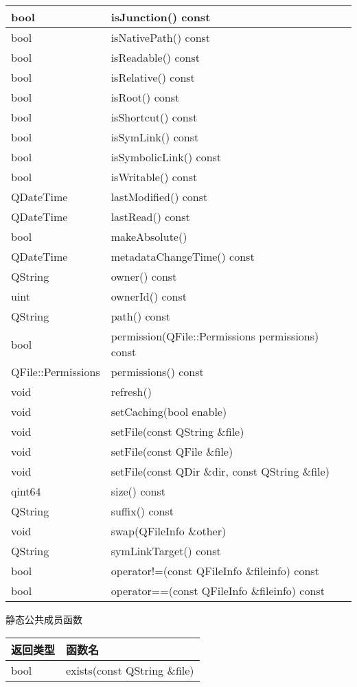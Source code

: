 \begin{longtable}{|l|l|}
\hline
bool& 	isJunction() const\\
\hline
bool& 	isNativePath() const\\
\hline
bool& 	isReadable() const\\
\hline
bool& 	isRelative() const\\
\hline
bool& 	isRoot() const\\
\hline
bool& 	isShortcut() const\\
\hline
bool& 	isSymLink() const\\
\hline
bool& 	isSymbolicLink() const\\
\hline
bool& 	isWritable() const\\
\hline
QDateTime& 	lastModified() const\\
\hline
QDateTime& 	lastRead() const\\
\hline
bool& 	makeAbsolute()\\
\hline
QDateTime& 	metadataChangeTime() const\\
\hline
QString& 	owner() const\\
\hline
uint& 	ownerId() const\\
\hline
QString& 	path() const\\
\hline
bool& 	permission(QFile::Permissions permissions) const\\
\hline
QFile::Permissions& 	permissions() const\\
\hline
void& 	refresh()\\
\hline
void& 	setCaching(bool enable)\\
\hline
void& 	setFile(const QString \&file)\\
\hline
void& 	setFile(const QFile \&file)\\
\hline
void& 	setFile(const QDir \&dir, const QString \&file)\\
\hline
qint64& 	size() const\\
\hline
QString& 	suffix() const\\
\hline
void& 	swap(QFileInfo \&other)\\
\hline
QString& 	symLinkTarget() const\\
\hline
bool& 	operator!=(const QFileInfo \&fileinfo) const\\
\hline
bool& 	operator==(const QFileInfo \&fileinfo) const\\
\hline
\end{longtable}

\splitLine

静态公共成员函数

\begin{tabular}{|l|l|}
\hline
返回类型 &	函数名\\
\hline
bool &	exists(const QString \&file)\\
\hline
\end{tabular}


